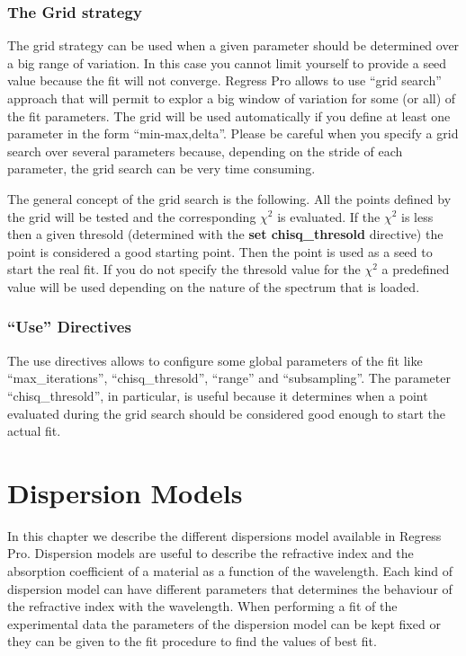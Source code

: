 \documentclass[a4paper]{report}
\begin{document}
\subsection{The Grid strategy}
The grid strategy can be used when a given parameter should be
determined over a big range of variation. In this case you cannot
limit yourself to provide a seed value because the fit will not
converge. Regress Pro allows to use ``grid search'' approach that will
permit to explor a big window of variation for some (or all) of the
fit parameters. The grid will be used automatically if you define at
least one parameter in the form ``min-max,delta''. Please be careful
when you specify a grid search over several parameters because,
depending on the stride of each parameter, the grid search can be very
time consuming.

The general concept of the grid search is the following. All the
points defined by the grid will be tested and the corresponding
$\chi^2$ is evaluated. If the $\chi^2$ is less then a given thresold
(determined with the \textbf{set chisq\_thresold} directive) the point
is considered a good starting point. Then the point is used as a seed
to start the real fit. If you do not specify the thresold value for
the $\chi^2$ a predefined value will be used depending on the nature
of the spectrum that is loaded.

\subsection{``Use'' Directives}
The use directives allows to configure some global parameters of the
fit like ``max\_iterations'', ``chisq\_thresold'', ``range'' and
``subsampling''. The parameter ``chisq\_thresold'', in particular, is
useful because it determines when a point evaluated during the grid
search should be considered good enough to start the actual fit.

\chapter{Dispersion Models}

In this chapter we describe the different dispersions model available in Regress Pro.
Dispersion models are useful to describe the refractive index and the absorption coefficient of a material as a function of the wavelength.
Each kind of dispersion model can have different parameters that determines the behaviour of the refractive index with the wavelength.
When performing a fit of the experimental data the parameters of the dispersion model can be kept fixed or they can be given to the fit procedure to find the values of best fit.
\end{document}
